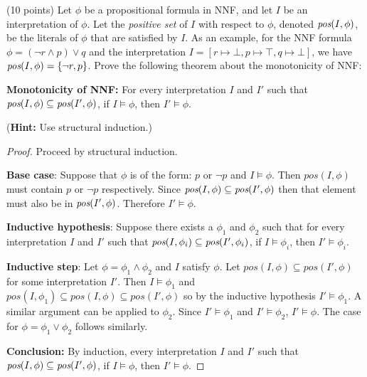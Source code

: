 \documentclass{article}
\newenvironment{solution}{\color{blue} \em }{}
\begin{document}
\begin{enumerate}
\begin{solution}
\end{solution}

\item (10 points)  Let $\phi$ be a propositional formula in NNF, and let $I$ be an interpretation of $\phi$. Let the \emph{positive set} of $I$ with respect to $\phi$, denoted $\emph{pos}(I, \phi)$, be the literals of $\phi$ that are satisfied by $I$. As an example, for the NNF formula $\phi = (\neg r \land p) \lor q$ and the interpretation $I = [r \mapsto \bot, p \mapsto \top, q \mapsto \bot]$, we have $\emph{pos}(I, \phi) = \{ \neg r, p \}$. Prove the following theorem about the monotonicity of NNF:

{\bf Monotonicity of NNF:} For every interpretation $I$ and $I'$ such that $\emph{pos}(I, \phi) \subseteq \emph{pos}(I', \phi)$, if $I \models \phi$, then $I' \models \phi$.

(\textbf{Hint:} Use structural induction.) \label{prob:NNF}

\begin{solution}
\begin{proof}
    Proceed by structural induction.

\item \textbf{Base case}: Suppose that $\phi$ is of the form: $p$ or $\neg p$ and $I \models \phi$. Then $pos(I, \phi)$ must contain $p$ or $\neg p$ respectively. Since $\emph{pos}(I, \phi) \subseteq \emph{pos}(I', \phi)$ then that element must also be in $\emph{pos}(I', \phi)$. Therefore $I' \models \phi$.

\item \textbf{Inductive hypothesis}: Suppose there exists a $\phi_1$ and $\phi_2$ such that for every interpretation $I$ and $I'$ such that $\emph{pos}(I, \phi_i) \subseteq \emph{pos}(I', \phi_i)$, if $I \models \phi_i$, then $I' \models \phi_i$.

\item \textbf{Inductive step}:
    Let $\phi = \phi_1 \land \phi_2$ and $I$ satisfy $\phi$. Let $pos(I, \phi) \subseteq pos(I', \phi)$ for some interpretation $I'$.  Then $I \models \phi_1$ and $pos(I, \phi_1) \subseteq pos(I, \phi) \subseteq pos(I', \phi)$ so by the inductive hypothesis $I' \models \phi_1$. A similar argument can be applied to $\phi_2$. Since $I' \models \phi_1$ and $I' \models \phi_2$, $I' \models \phi$.
The case for $\phi = \phi_1 \lor \phi_2$ follows similarly.

\item \textbf{Conclusion: } By induction, every interpretation $I$ and $I'$ such that $\emph{pos}(I, \phi) \subseteq \emph{pos}(I', \phi)$, if $I \models \phi$, then $I' \models \phi$.



\end{proof}
\end{solution}
\end{enumerate}
\end{document}

